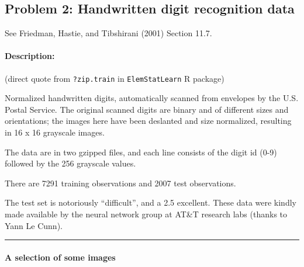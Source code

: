 \documentclass[]{article}
\let\oldparagraph\paragraph
\renewcommand{\paragraph}[1]{\oldparagraph{#1}\mbox{}}
\begin{document}
\subsection{Problem 2: Handwritten digit recognition
data}\label{problem-2-handwritten-digit-recognition-data}

See Friedman, Hastie, and Tibshirani (2001) Section 11.7.

\paragraph{Description:}\label{description}

(direct quote from \texttt{?zip.train} in \texttt{ElemStatLearn} R
package)

Normalized handwritten digits, automatically scanned from envelopes by
the U.S. Postal Service. The original scanned digits are binary and of
different sizes and orientations; the images here have been deslanted
and size normalized, resulting in 16 x 16 grayscale images.

The data are in two gzipped files, and each line consists of the digit
id (0-9) followed by the 256 grayscale values.

There are 7291 training observations and 2007 test observations.

The test set is notoriously ``difficult'', and a 2.5 excellent. These
data were kindly made available by the neural network group at AT\&T
research labs (thanks to Yann Le Cunn).

\begin{center}\rule{0.5\linewidth}{\linethickness}\end{center}

\paragraph{A selection of some images}\label{a-selection-of-some-images}
\end{document}
